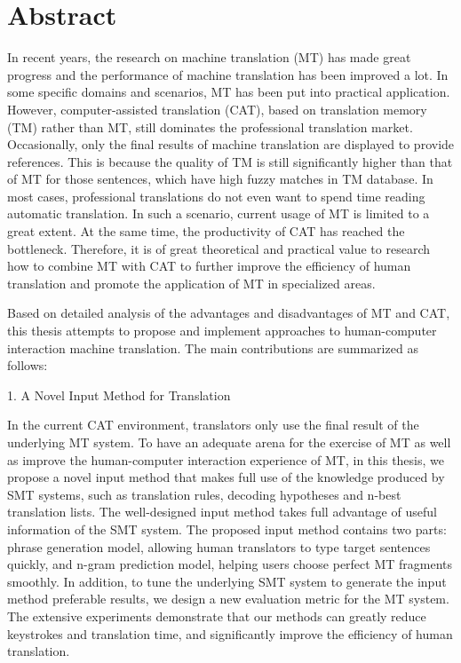 
\chapter{Abstract}
In recent years, the research on machine translation (MT) has made great progress and the performance of machine translation has been improved a lot. In some specific domains and scenarios, MT has been put into practical application. However, computer-assisted translation (CAT), based on translation memory (TM) rather than MT, still dominates the professional translation market. Occasionally, only the final results of machine translation are displayed to provide references. This is because the quality of TM is still significantly higher than that of MT for those sentences, which have high fuzzy matches in TM database. In most cases, professional translations do not even want to spend time reading automatic translation. In such a scenario, current usage of MT is limited to a great extent. At the same time, the productivity of CAT has reached the bottleneck. Therefore, it is of great theoretical and practical value to research how to combine MT with CAT to further improve the efficiency of human translation and promote the application of MT in specialized areas.

Based on detailed analysis of the advantages and disadvantages of MT and CAT, this thesis attempts to propose and implement approaches to human-computer interaction machine translation. The main contributions are summarized as follows:

1. A Novel Input Method for Translation

In the current CAT environment, translators only use the final result of the underlying MT system. To have an adequate arena for the exercise of MT as well as improve the human-computer interaction experience of MT, in this thesis, we propose a novel input method that makes full use of the knowledge produced by SMT systems, such as translation rules, decoding hypotheses and n-best translation lists. The well-designed input method takes full advantage of useful information of the SMT system. The proposed input method contains two parts: phrase generation model, allowing human translators to type target sentences quickly, and n-gram prediction model, helping users choose perfect MT fragments smoothly. In addition, to tune the underlying SMT system to generate the input method preferable results, we design a new evaluation metric for the MT system. The extensive experiments demonstrate that our methods can greatly reduce keystrokes and translation time, and significantly improve the efficiency of human translation.

